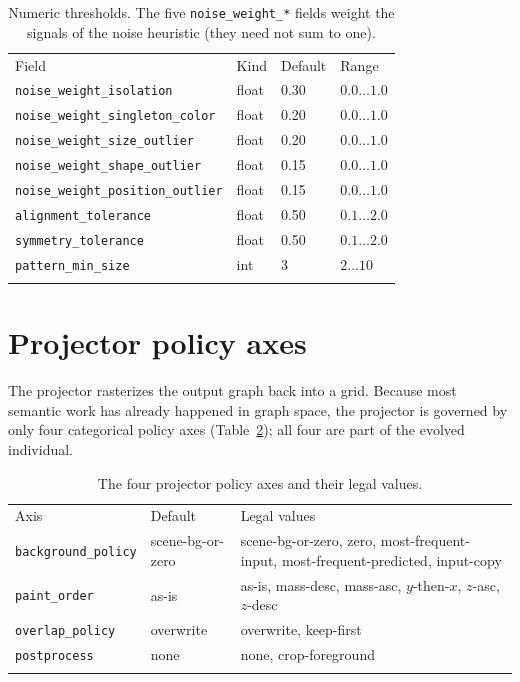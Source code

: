 \begin{table}[htbp]
\centering
\caption{Numeric thresholds. The five \texttt{noise\_weight\_*} fields weight the signals
of the noise heuristic (they need not sum to one).}
\label{tab:app-cfg-thresh}
\small
\begin{tabular}{p{5.2cm}p{1.7cm}p{2.0cm}p{3.2cm}}
\hline\noalign{\smallskip}
Field & Kind & Default & Range \\
\noalign{\smallskip}\hline\noalign{\smallskip}
\texttt{noise\_weight\_isolation} & float & 0.30 & $0.0 \ldots 1.0$ \\
\texttt{noise\_weight\_singleton\_color} & float & 0.20 & $0.0 \ldots 1.0$ \\
\texttt{noise\_weight\_size\_outlier} & float & 0.20 & $0.0 \ldots 1.0$ \\
\texttt{noise\_weight\_shape\_outlier} & float & 0.15 & $0.0 \ldots 1.0$ \\
\texttt{noise\_weight\_position\_outlier} & float & 0.15 & $0.0 \ldots 1.0$ \\
\texttt{alignment\_tolerance} & float & 0.50 & $0.1 \ldots 2.0$ \\
\texttt{symmetry\_tolerance} & float & 0.50 & $0.1 \ldots 2.0$ \\
\texttt{pattern\_min\_size} & int & 3 & $2 \ldots 10$ \\
\noalign{\smallskip}\hline
\end{tabular}
\end{table}

\section{Projector policy axes}
\label{app:projectorconfig}

The projector rasterizes the output graph back into a grid. Because most semantic work has
already happened in graph space, the projector is governed by only four categorical policy
axes (Table~\ref{tab:app-projector}); all four are part of the evolved individual.

\begin{table}[htbp]
\centering
\caption{The four projector policy axes and their legal values.}
\label{tab:app-projector}
\small
\begin{tabular}{p{3.0cm}p{3.4cm}p{6.4cm}}
\hline\noalign{\smallskip}
Axis & Default & Legal values \\
\noalign{\smallskip}\hline\noalign{\smallskip}
\texttt{background\_policy} & scene-bg-or-zero & scene-bg-or-zero, zero, most-frequent-input, most-frequent-predicted, input-copy \\
\texttt{paint\_order} & as-is & as-is, mass-desc, mass-asc, $y$-then-$x$, $z$-asc, $z$-desc \\
\texttt{overlap\_policy} & overwrite & overwrite, keep-first \\
\texttt{postprocess} & none & none, crop-foreground \\
\noalign{\smallskip}\hline
\end{tabular}
\end{table}

